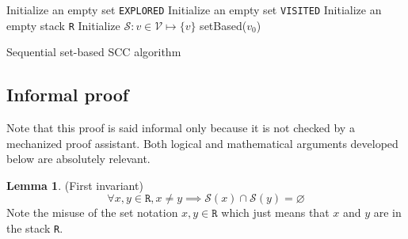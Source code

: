 \documentclass[a4 paper, 12pt]{article}
\theoremstyle{definition}
\def\GG{\ensuremath{\mathcal{G}}}
\def\VV{\ensuremath{\mathcal{V}}}
\def\EE{\ensuremath{\mathcal{E}}}
\newtheorem{lemma}{Lemma}
\begin{document}
\noindent
\begin{algorithm}[H]\label{alg:seqsetbased}
    \SetAlgoLined
    \KwData{\GG = (\VV, \EE), $v_0$\;}
    Initialize an empty set \texttt{EXPLORED}\;
    Initialize an empty set \texttt{VISITED}\;
    Initialize an empty stack \texttt{R}\;
    Initialize $\mathcal{S} \colon v \in \VV \mapsto \{v\}$\;
    setBased($v_0$)\;
    
    \caption{Sequential set-based SCC algorithm}
\end{algorithm}


\subsection{Informal proof}
Note that this proof is said informal only because it is not checked by a mechanized proof assistant. Both logical and mathematical arguments developed below are absolutely relevant.

\begin{lemma}(First invariant)\label{lemma:disjointness}
    \begin{equation*}
        \forall x, y \in \texttt{R}, x\neq y \implies \mathcal{S}(x) \cap \mathcal{S}(y) = \varnothing
    \end{equation*}
    Note the misuse of the set notation $x, y \in \texttt{R}$ which just means that $x$ and $y$ are in the stack \texttt{R}.
\end{lemma}
\end{document}
